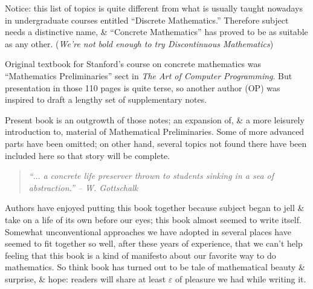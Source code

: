 \documentclass{article}
\begin{document}
\begin{enumerate}
	Notice: this list of topics is quite different from what is usually taught nowadays in undergraduate courses entitled ``Discrete Mathematics.'' Therefore subject needs a distinctive name,  \& ``Concrete Mathematics'' has proved to be as suitable as any other. ({\it We're not bold enough to try Discontinuous Mathematics})
	
	Original textbook for Stanford's course on concrete mathematics was ``Mathematics Preliminaries'' sect in {\it The Art of Computer Programming}. But presentation in those 110 pages is quite terse, so another author (OP) was inspired to  draft a lengthy set of supplementary notes.
	
	Present book is an outgrowth of those notes; an expansion of, \& a more leisurely introduction to, material of Mathematical Preliminaries. Some of more advanced parts have been omitted; on other hand, several topics not found there have been included here so that story will be complete.
	\begin{quote}\it
		``$\ldots$ a concrete life preserver thrown to students sinking in a sea of abstraction.'' -- {\sc W. Gottschalk}
	\end{quote}
	Authors have enjoyed putting this book together because subject began to jell \& take on a life of its own before our eyes; this book almost seemed to write itself. Somewhat unconventional approaches we have adopted in several places have seemed to fit together so well, after these years of experience, that we can't help feeling that this book is a kind of manifesto about our favorite way to do mathematics. So think book has turned out to be tale of mathematical beauty \& surprise, \& hope: readers will share at least $\varepsilon$ of pleasure we had while writing it.
	

\end{enumerate}
\end{document}
